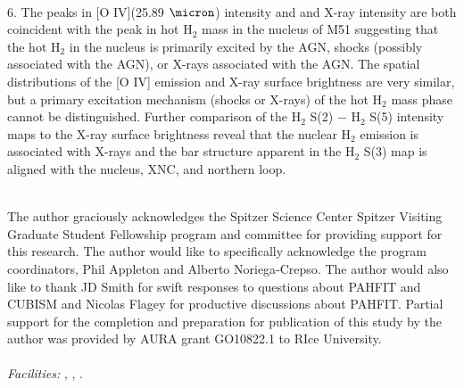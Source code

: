 \documentclass[manuscript]{aastex}
\begin{document}
\\
6.  The peaks in [O IV](25.89 $\micron$) intensity and and X-ray intensity are both coincident with the peak in hot $\mathrm{H_2}$ mass in the nucleus of M51 suggesting that the hot $\mathrm{H_2}$ in the nucleus is primarily excited by the AGN, shocks (possibly associated with the AGN), or X-rays associated with the AGN.  The spatial distributions of the [O IV] emission and X-ray surface brightness are very similar, but a primary excitation mechanism (shocks or X-rays) of the hot $\mathrm{H_2}$ mass phase cannot be distinguished.  Further comparison of the $\mathrm{H_2}$ S(2) $-$ $\mathrm{H_2}$ S(5) intensity maps to the X-ray surface brightness reveal that the nuclear $\mathrm{H_2}$ emission is associated with X-rays and the bar structure apparent in the $\mathrm{H_2}$ S(3) map is aligned with the nucleus, XNC, and northern loop.\\
\\

\acknowledgments

The author graciously acknowledges the Spitzer Science Center Spitzer Visiting Graduate Student Fellowship program and committee for providing support for this research.  The author would like to specifically acknowledge the program coordinators, Phil Appleton and Alberto Noriega-Crepso.  The author would also like to thank JD Smith for swift responses to questions about PAHFIT and CUBISM and Nicolas Flagey for productive discussions about PAHFIT.  Partial support for the completion and preparation for publication of this study by the author was provided by AURA grant GO10822.1 to RIce University.\\
\\
{\it Facilities:} , , .
\end{document}
